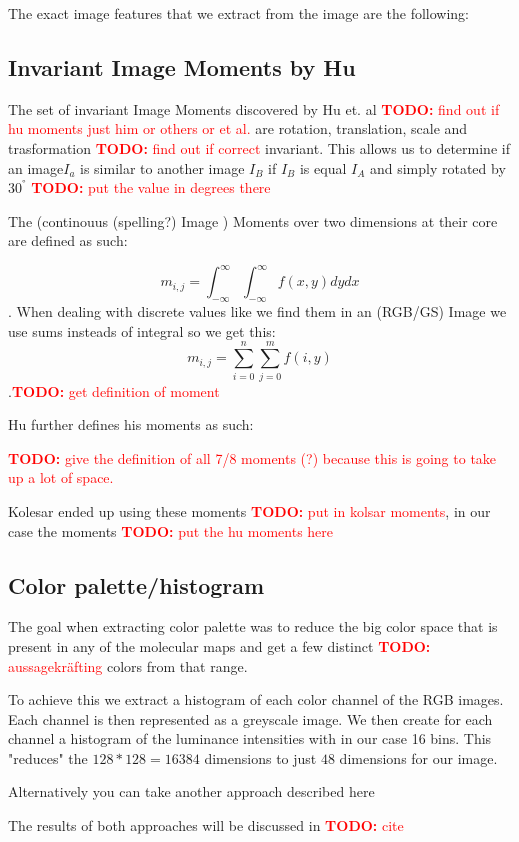 \documentclass[journal]{vgtc}       %
\newcommand{\todo}[1]{\textcolor{red}{\textbf{TODO:} #1}}
\begin{document}
The exact image features that we extract from the image are the following:

\subsection{Invariant Image Moments by Hu}

The set of invariant Image Moments discovered by Hu et. al \todo{find out if hu moments just him or others or et al.} are rotation, translation, scale and trasformation \todo{find out if correct} invariant. This allows us to determine if an image$I_a$ is similar to another image $I_B$ if $I_B$ is equal $I_A$ and simply rotated by $30^°$ \todo{put the value in degrees there}

The (continouus (spelling?)  Image ) Moments  over two dimensions at their core are defined as such:

\[m_{i,j} = \int^\infty_{- \infty}\int^\infty_{- \infty} f(x,y) dy dx \]. When dealing with discrete values like we find them in an (RGB/GS) Image we use sums insteads of integral so we get this:
\[m_{i,j} = \sum^n_{i=0}\sum^m_{j=0} f(i,y) \].\todo{get definition of moment}

Hu further defines his moments as such:
 
\todo{give the definition of all 7/8 moments (?) because this is going to take up a lot of space. }

Kolesar ended up using these moments \todo{put in kolsar moments}, in our case the moments \todo{put the hu moments here}

\subsection{Color palette/histogram }

The goal when extracting color palette was to reduce the big color space that is present in any of the molecular maps and get a few distinct \todo{aussagekräfting} colors from that range.

To achieve this we extract a histogram of each color channel of the RGB images. Each channel is then represented as a greyscale image. We then create for each channel a histogram of the luminance intensities with in our case 16 bins. This "reduces" the \(128*128 = 16384\) dimensions to just \(48\) dimensions for our image.

Alternatively you can take another approach described here

The results of both approaches will be discussed in \todo{cite}
\end{document}
